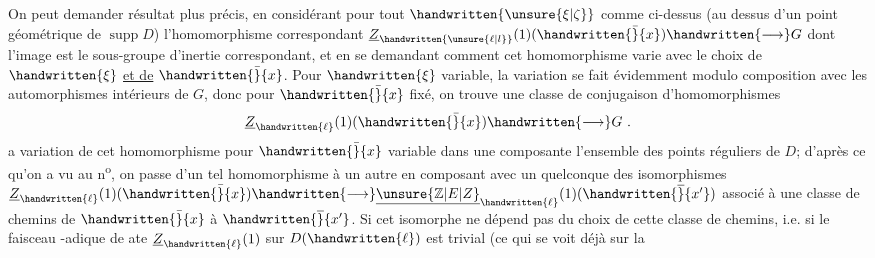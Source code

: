  On peut demander  résultat plus précis, en  considérant pour tout $\handwritten{\unsure{\xi|\zeta}}$ comme ci-dessus (au dessus d'un point géométrique de $\operatorname{supp}D$) l'homomorphisme correspondant $\underline{Z}_{\handwritten{\unsure{\ell|l}}}(1)(\handwritten{\bar}{x})\handwritten{\longrightarrow}G$ dont l'image est le sous-groupe d'inertie correspondant, et en se demandant comment cet homomorphisme varie avec le choix de $\handwritten{\xi}$ \uline{et de} $\handwritten{\bar}{x}$. Pour $\handwritten{\xi}$ variable, la variation se fait évidemment modulo composition avec les automorphismes intérieurs de $G$,  donc pour $\handwritten{\bar}{x}$ fixé, on trouve une classe de conjugaison d'homomorphismes
\[
\underline{Z}_{\handwritten{\ell}}(1)(\handwritten{\bar}{x})\handwritten{\longrightarrow}G\ .
\]
 a variation de cet homomorphisme\handwritten{,} pour $\handwritten{\bar}{x}$ variable dans une composante  l'ensemble des points réguliers de $D$; d'après ce qu'on a vu au n\textsuperscript{o}, on passe d'un tel homomorphisme à un autre en composant avec un quelconque des isomorphismes $\underline{Z}_{\handwritten{\ell}}(1)(\handwritten{\bar}{x})\handwritten{\longrightarrow}\underline{\unsure{\mathbb{Z}|E|Z}}_{\handwritten{\ell}}(1)(\handwritten{\overline}{x'})$ associé à une classe de chemins de $\handwritten{\bar}{x}$ à $\handwritten{\overline}{x'}$. Si cet isomorphe ne dépend pas du choix de cette classe de chemins, i.e. si le faisceau -adique de ate $\underline{Z}_{\handwritten{\ell}}(1)$ sur $D(\handwritten{\ell})$ est trivial (ce qui se voit déjà sur la


